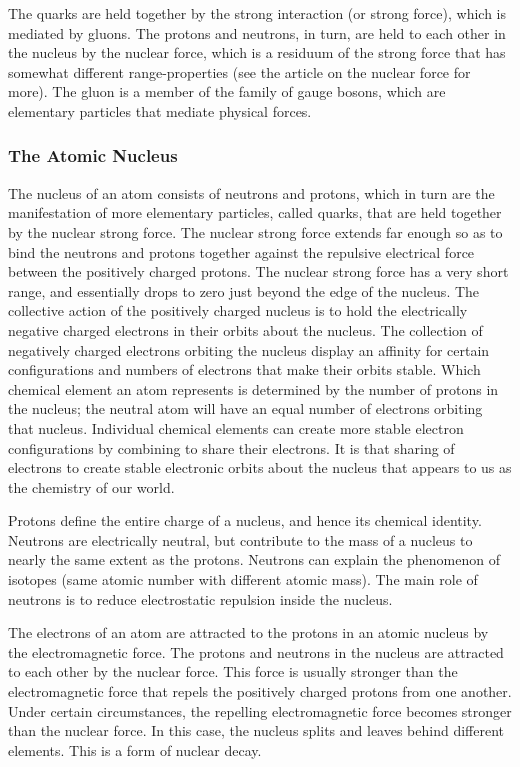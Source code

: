 The quarks are held together by the strong interaction (or strong
force), which is mediated by gluons. The protons and neutrons, in turn,
are held to each other in the nucleus by the nuclear force, which is a
residuum of the strong force that has somewhat different
range-properties (see the article on the nuclear force for more). The
gluon is a member of the family of gauge bosons, which are elementary
particles that mediate physical forces.

\hypertarget{the-atomic-nucleus}{%
\subsubsection{The Atomic Nucleus}\label{the-atomic-nucleus}}

The nucleus of an atom consists of neutrons and protons, which in turn
are the manifestation of more elementary particles, called quarks, that
are held together by the nuclear strong force. The nuclear strong force
extends far enough so as to bind the neutrons and protons together
against the repulsive electrical force between the positively charged
protons. The nuclear strong force has a very short range, and
essentially drops to zero just beyond the edge of the nucleus. The
collective action of the positively charged nucleus is to hold the
electrically negative charged electrons in their orbits about the
nucleus. The collection of negatively charged electrons orbiting the
nucleus display an affinity for certain configurations and numbers of
electrons that make their orbits stable. Which chemical element an atom
represents is determined by the number of protons in the nucleus; the
neutral atom will have an equal number of electrons orbiting that
nucleus. Individual chemical elements can create more stable electron
configurations by combining to share their electrons. It is that sharing
of electrons to create stable electronic orbits about the nucleus that
appears to us as the chemistry of our world.

Protons define the entire charge of a nucleus, and hence its chemical
identity. Neutrons are electrically neutral, but contribute to the mass
of a nucleus to nearly the same extent as the protons. Neutrons can
explain the phenomenon of isotopes (same atomic number with different
atomic mass). The main role of neutrons is to reduce electrostatic
repulsion inside the nucleus.

The electrons of an atom are attracted to the protons in an atomic
nucleus by the electromagnetic force. The protons and neutrons in the
nucleus are attracted to each other by the nuclear force. This force is
usually stronger than the electromagnetic force that repels the
positively charged protons from one another. Under certain
circumstances, the repelling electromagnetic force becomes stronger than
the nuclear force. In this case, the nucleus splits and leaves behind
different elements. This is a form of nuclear decay.


